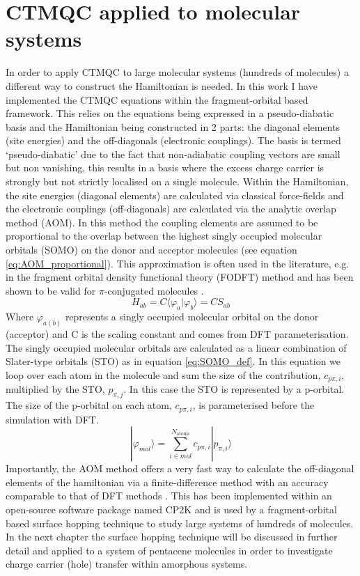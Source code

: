 \chapter{CTMQC applied to molecular systems}
\label{chap:molecular_systems}
In order to apply CTMQC to large molecular systems (hundreds of molecules) a different way to construct the Hamiltonian is needed. In this work I have implemented the CTMQC equations within the fragment-orbital based framework. This relies on the equations being expressed in a pseudo-diabatic basis and the Hamiltonian being constructed in 2 parts: the diagonal elements (site energies) and the off-diagonals (electronic couplings). The basis is termed `pseudo-diabatic' due to the fact that non-adiabatic coupling vectors are small but non vanishing, this results in a basis where the excess charge carrier is strongly but not strictly localised on a single molecule. Within the Hamiltonian, the site energies (diagonal elements) are calculated via classical force-fields and the electronic couplings (off-diagonals) are calculated via the analytic overlap method \cite{gajdos_ultrafast_2014, spencer_fob-sh:_2016} (AOM). In this method the coupling elements are assumed to be proportional to the overlap between the highest singly occupied molecular orbitals (SOMO) on the donor and acceptor molecules (see equation \eqref{eq:AOM_proportional}). This approximation is often used in the literature, e.g. in the fragment orbital density functional theory \cite{KirkpatrickJ2008,C2CP41348E,TroisiA2002} (FODFT) method and has been shown to be valid for $\pi$-conjugated molecules \cite{KubasA2014, gajdos_ultrafast_2014}.
\begin{equation}
  H_{ab} = C \langle \varphi_{a} | \varphi_{b} \rangle = C S_{ab}
  \label{eq:AOM_proportional}
\end{equation}
Where $\varphi_{a(b)}$ represents a singly occupied molecular orbital on the donor (acceptor) and C is the scaling constant and comes from DFT parameterisation. The singly occupied molecular orbitals are calculated as a linear combination of Slater-type orbitals (STO) as in equation  \eqref{eq:SOMO_def}. In this equation we loop over each atom in the molecule and sum the size of the contribution, $c_{p\pi, i}$, multiplied by the STO, $p_{\pi, j}$. In this case the STO is represented by a p-orbital. The size of the p-orbital on each atom, $c_{p\pi, i}$, is parameterised before the simulation with DFT.
\begin{equation}
  | \varphi_{mol} \rangle = \sum_{i \in mol}^{N_{\text{atoms}}} c_{p\pi, i} | p_{\pi, i} \rangle
  \label{eq:SOMO_def}
\end{equation}
Importantly, the AOM method offers a very fast way to calculate the off-diagonal elements of the hamiltonian via a finite-difference method with an accuracy comparable to that of DFT methods \cite{AOM_vs_HigherOrder}. This has been implemented within an open-source software package named CP2K and is used by a fragment-orbital based surface hopping technique to study large systems of hundreds of molecules. In the next chapter the surface hopping technique will be discussed in further detail and applied to a system of pentacene molecules in order to investigate charge carrier (hole) transfer within amorphous systems.


